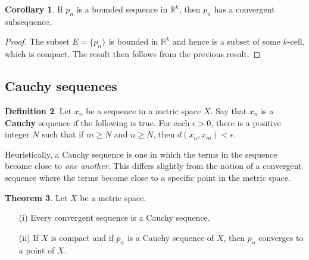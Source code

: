 \documentclass[12pt]{article}
\theoremstyle{definition}
\newtheorem{definition}{Definition}
\theoremstyle{theorem}
\newtheorem{theorem}[definition]{Theorem}
\newtheorem{corollary}[definition]{Corollary}
\begin{document}
\begin{corollary}
If $p_n$ is a bounded sequence in $\mathbb{R}^k$, then $p_n$ has a convergent subsequence. 
\end{corollary}

\begin{proof}
The subset $E = \{p_n\}$ is bounded in $\mathbb{R}^k$ and hence is a subset of some $k$-cell, which is compact. The result then follows from the previous result.
\end{proof}

\subsection{Cauchy sequences}

\begin{definition}
Let $x_n$ be a sequence in a metric space $X$. Say that $x_n$ is a \textbf{Cauchy} sequence if the following is true. For each $\epsilon > 0$, there is a positive integer $N$ such that if $m \geqslant N$ and $n \geqslant N$, then $d(x_n, x_m) < \epsilon$. 
\end{definition}

Heuristically, a Cauchy sequence is one in which the terms in the sequence become close to \emph{one another}. This differs slightly from the notion of a convergent sequence where the terms become close to a specific point in the metric space. 

\begin{theorem}
Let $X$ be a metric space. 
\begin{enumerate}
\item[(i)] Every convergent sequence is a Cauchy sequence. 
\item[(ii)] If $X$ is compact and if $p_n$ is a Cauchy sequence of $X$, then $p_n$ converges to a point of $X$. 
\end{enumerate}
\end{theorem}
\end{document}
